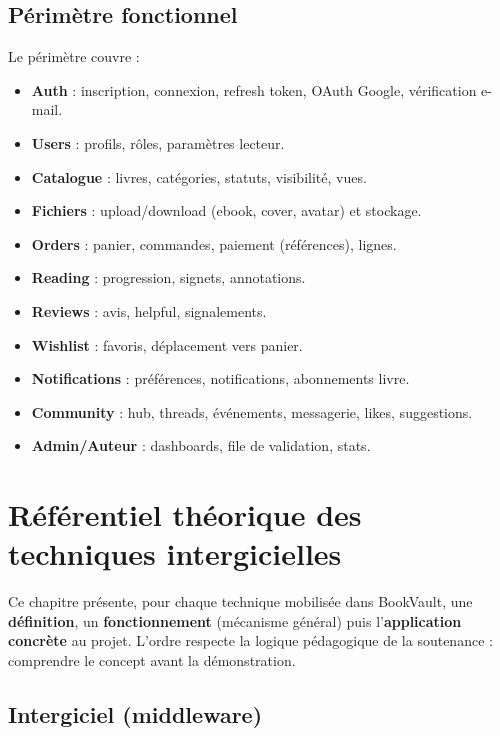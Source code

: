 \documentclass[12pt,a4paper]{report}
\begin{document}
\section{Périmètre fonctionnel}
Le périmètre couvre :
\begin{itemize}
  \item \textbf{Auth} : inscription, connexion, refresh token, OAuth Google, vérification e-mail.
  \item \textbf{Users} : profils, rôles, paramètres lecteur.
  \item \textbf{Catalogue} : livres, catégories, statuts, visibilité, vues.
  \item \textbf{Fichiers} : upload/download (ebook, cover, avatar) et stockage.
  \item \textbf{Orders} : panier, commandes, paiement (références), lignes.
  \item \textbf{Reading} : progression, signets, annotations.
  \item \textbf{Reviews} : avis, helpful, signalements.
  \item \textbf{Wishlist} : favoris, déplacement vers panier.
  \item \textbf{Notifications} : préférences, notifications, abonnements livre.
  \item \textbf{Community} : hub, threads, événements, messagerie, likes, suggestions.
  \item \textbf{Admin/Auteur} : dashboards, file de validation, stats.
\end{itemize}

\chapter{Référentiel théorique des techniques intergicielles}
\label{ch:referentiel}

Ce chapitre présente, pour chaque technique mobilisée dans BookVault, une \textbf{définition}, un \textbf{fonctionnement} (mécanisme général) puis l'\textbf{application concrète} au projet. L'ordre respecte la logique pédagogique de la soutenance : comprendre le concept avant la démonstration.

\section{Intergiciel (middleware)}
\end{document}
